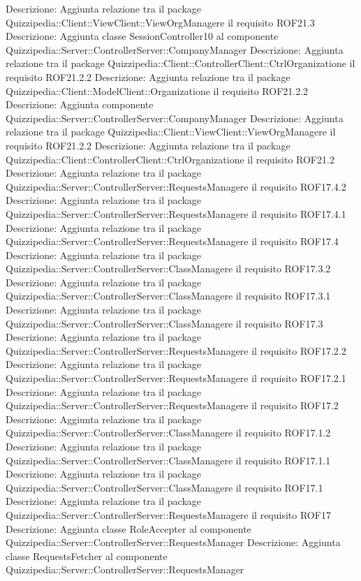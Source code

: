 Descrizione: Aggiunta relazione tra il package Quizzipedia::Client::ViewClient::ViewOrgManagere il requisito ROF21.3 
Descrizione: Aggiunta classe SessionController10 al componente Quizzipedia::Server::ControllerServer::CompanyManager 
Descrizione: Aggiunta relazione tra il package Quizzipedia::Client::ControllerClient::CtrlOrganizatione il requisito ROF21.2.2 
Descrizione: Aggiunta relazione tra il package Quizzipedia::Client::ModelClient::Organizatione il requisito ROF21.2.2 
Descrizione: Aggiunta componente Quizzipedia::Server::ControllerServer::CompanyManager 
Descrizione: Aggiunta relazione tra il package Quizzipedia::Client::ViewClient::ViewOrgManagere il requisito ROF21.2.2 
Descrizione: Aggiunta relazione tra il package Quizzipedia::Client::ControllerClient::CtrlOrganizatione il requisito ROF21.2 
Descrizione: Aggiunta relazione tra il package Quizzipedia::Server::ControllerServer::RequestsManagere il requisito ROF17.4.2 
Descrizione: Aggiunta relazione tra il package Quizzipedia::Server::ControllerServer::RequestsManagere il requisito ROF17.4.1 
Descrizione: Aggiunta relazione tra il package Quizzipedia::Server::ControllerServer::RequestsManagere il requisito ROF17.4 
Descrizione: Aggiunta relazione tra il package Quizzipedia::Server::ControllerServer::ClassManagere il requisito ROF17.3.2 
Descrizione: Aggiunta relazione tra il package Quizzipedia::Server::ControllerServer::ClassManagere il requisito ROF17.3.1 
Descrizione: Aggiunta relazione tra il package Quizzipedia::Server::ControllerServer::ClassManagere il requisito ROF17.3 
Descrizione: Aggiunta relazione tra il package Quizzipedia::Server::ControllerServer::RequestsManagere il requisito ROF17.2.2 
Descrizione: Aggiunta relazione tra il package Quizzipedia::Server::ControllerServer::RequestsManagere il requisito ROF17.2.1 
Descrizione: Aggiunta relazione tra il package Quizzipedia::Server::ControllerServer::RequestsManagere il requisito ROF17.2 
Descrizione: Aggiunta relazione tra il package Quizzipedia::Server::ControllerServer::ClassManagere il requisito ROF17.1.2 
Descrizione: Aggiunta relazione tra il package Quizzipedia::Server::ControllerServer::ClassManagere il requisito ROF17.1.1 
Descrizione: Aggiunta relazione tra il package Quizzipedia::Server::ControllerServer::ClassManagere il requisito ROF17.1 
Descrizione: Aggiunta relazione tra il package Quizzipedia::Server::ControllerServer::RequestsManagere il requisito ROF17 
Descrizione: Aggiunta classe RoleAccepter al componente Quizzipedia::Server::ControllerServer::RequestsManager 
Descrizione: Aggiunta classe RequestsFetcher al componente Quizzipedia::Server::ControllerServer::RequestsManager 
